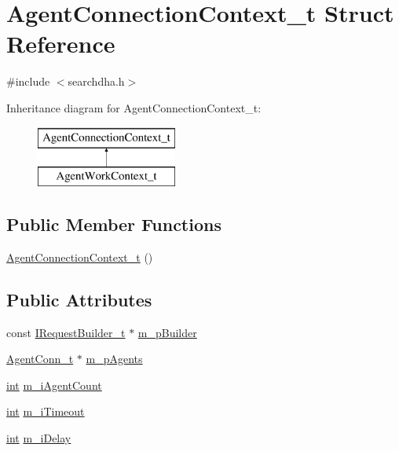 \hypertarget{structAgentConnectionContext__t}{\section{Agent\-Connection\-Context\-\_\-t Struct Reference}
\label{structAgentConnectionContext__t}
}


{\ttfamily \#include $<$searchdha.\-h$>$}

Inheritance diagram for Agent\-Connection\-Context\-\_\-t\-:\begin{figure}[H]
\begin{center}
\leavevmode
\includegraphics[height=2.000000cm]{structAgentConnectionContext__t}
\end{center}
\end{figure}
\subsection*{Public Member Functions}
\begin{DoxyCompactItemize}
\item 
\hyperlink{structAgentConnectionContext__t_aff2f2804c5848ab0e398a2e096596622}{Agent\-Connection\-Context\-\_\-t} ()
\end{DoxyCompactItemize}
\subsection*{Public Attributes}
\begin{DoxyCompactItemize}
\item 
const \hyperlink{structIRequestBuilder__t}{I\-Request\-Builder\-\_\-t} $\ast$ \hyperlink{structAgentConnectionContext__t_a80006cc7fa860f2fccfa59f3a59a1526}{m\-\_\-p\-Builder}
\item 
\hyperlink{structAgentConn__t}{Agent\-Conn\-\_\-t} $\ast$ \hyperlink{structAgentConnectionContext__t_a481c6f09f0bba4d98fbbb24a999a3a69}{m\-\_\-p\-Agents}
\item 
\hyperlink{sphinxexpr_8cpp_a4a26e8f9cb8b736e0c4cbf4d16de985e}{int} \hyperlink{structAgentConnectionContext__t_aca16f8f170cdb37cf9d6c3008fc9f2ea}{m\-\_\-i\-Agent\-Count}
\item 
\hyperlink{sphinxexpr_8cpp_a4a26e8f9cb8b736e0c4cbf4d16de985e}{int} \hyperlink{structAgentConnectionContext__t_a73220d8952b0678723e317c78f3656ff}{m\-\_\-i\-Timeout}
\item 
\hyperlink{sphinxexpr_8cpp_a4a26e8f9cb8b736e0c4cbf4d16de985e}{int} \hyperlink{structAgentConnectionContext__t_a6b8e36d18d67d8c9e6ca8dbd6d68a0d2}{m\-\_\-i\-Delay}
\end{DoxyCompactItemize}


